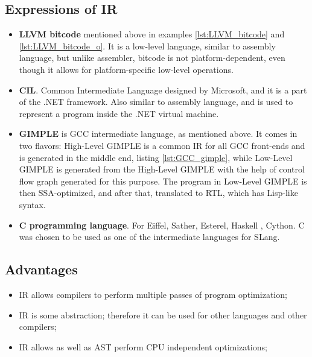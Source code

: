 \subsection{Expressions of IR}
\begin{itemize}
    \item \textbf{LLVM bitcode} mentioned above in examples \ref{lst:LLVM_bitcode} and \ref{lst:LLVM_bitcode_o}. It is a low-level language, similar to assembly language, but unlike assembler, bitcode is not platform-dependent, even though it allows for platform-specific low-level operations.

    \item \textbf{CIL}. Common Intermediate Language designed by Microsoft, and it is a part of the .NET framework. Also similar to assembly language, and is used to represent a program inside the .NET virtual machine.

    \item \textbf{GIMPLE} is GCC intermediate language, as mentioned above. It comes in two flavors: High-Level GIMPLE is a common IR for all GCC front-ends and is generated in the middle end, listing \ref{lst:GCC_gimple}, while Low-Level GIMPLE is generated from the High-Level GIMPLE with the help of control flow graph generated for this purpose. The program in Low-Level GIMPLE is then SSA-optimized, and after that, translated to RTL, which has Lisp-like syntax.

    \item \textbf{C programming language}. For Eiffel, Sather, Esterel, Haskell \cite{GlasgowHaskellCompiler}, Cython. C was chosen to be used as one of the intermediate languages for SLang.
\end{itemize}

\subsection{Advantages}
\begin{itemize}
    \item IR allows compilers to perform multiple passes of program optimization;
    \item IR is some abstraction; therefore it can be used for other languages and other compilers;
    \item IR allows as well as AST perform CPU independent optimizations;
\end{itemize}


